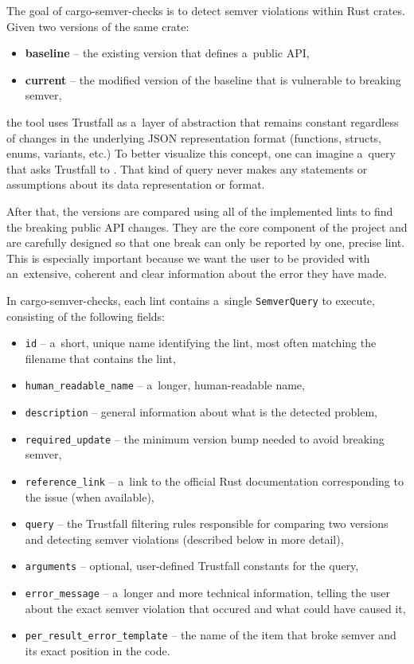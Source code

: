 \documentclass[licencjacka,en]{pracamgr}
\begin{document}
The goal of cargo-semver-checks is to detect semver violations within Rust crates. Given two
versions of the same crate:
\begin{itemize}
	\item \textbf{baseline} -- the existing version that defines a~public API,
	\item \textbf{current} -- the modified version of the baseline that is vulnerable to
		breaking semver,
\end{itemize}
the tool uses Trustfall as a~layer of abstraction that remains constant regardless of changes in
the underlying JSON representation format (functions, structs, enums, variants, etc.) To better
visualize this concept, one can imagine a~query that asks Trustfall to . That kind
of query never makes any statements or assumptions about its data representation or format.

After that, the versions are compared using all of the implemented lints to find the breaking
public API changes. They are the core component of the project and are carefully designed so that
one break can only be reported by one, precise lint. This is especially important because we want
the user to be provided with an~extensive, coherent and clear information about the error they
have made.

In cargo-semver-checks, each lint contains a~single \texttt{SemverQuery} to execute, consisting of
the following fields:

\begin{itemize}
	\item \texttt{id} -- a~short, unique name identifying the lint, most often matching the
		filename that contains the lint,
	\item \texttt{human\_readable\_name} -- a~longer, human-readable name,
	\item \texttt{description} -- general information about what is the detected problem,
	\item \texttt{required\_update} -- the minimum version bump needed to avoid breaking semver,
	\item \texttt{reference\_link} -- a~link to the official Rust documentation corresponding to
		the issue (when available),
	\item \texttt{query} -- the Trustfall filtering rules responsible for comparing two versions and
		detecting semver violations (described below in more detail),
	\item \texttt{arguments} -- optional, user-defined Trustfall constants for the query,
	\item \texttt{error\_message} -- a~longer and more technical information, telling the user
	    about the exact semver violation that occured and what could have caused it,
	\item \texttt{per\_result\_error\_template} -- the name of the item that broke semver and
	    its exact position in the code.
\end{itemize}
\end{document}
